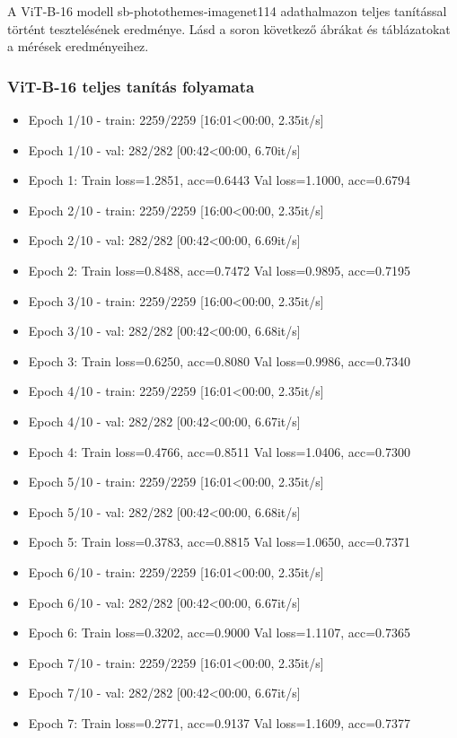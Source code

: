 A ViT-B-16 modell sb-photothemes-imagenet114 adathalmazon teljes tanítással történt tesztelésének eredménye. Lásd a soron következő ábrákat és táblázatokat a mérések eredményeihez.
\subsubsection{ViT-B-16 teljes tanítás folyamata}
\begin{itemize} 
	\item Epoch 1/10 - train: 2259/2259 [16:01<00:00,  2.35it/s]
	\item Epoch 1/10 - val: 282/282 [00:42<00:00,  6.70it/s]
	\item Epoch 1: Train loss=1.2851, acc=0.6443 Val loss=1.1000, acc=0.6794
	\item Epoch 2/10 - train: 2259/2259 [16:00<00:00,  2.35it/s]
	\item Epoch 2/10 - val: 282/282 [00:42<00:00,  6.69it/s]
	\item Epoch 2: Train loss=0.8488, acc=0.7472 Val loss=0.9895, acc=0.7195
	\item Epoch 3/10 - train: 2259/2259 [16:00<00:00,  2.35it/s]
	\item Epoch 3/10 - val: 282/282 [00:42<00:00,  6.68it/s]
	\item Epoch 3: Train loss=0.6250, acc=0.8080 Val loss=0.9986, acc=0.7340
	\item Epoch 4/10 - train: 2259/2259 [16:01<00:00,  2.35it/s]
	\item Epoch 4/10 - val: 282/282 [00:42<00:00,  6.67it/s]
	\item Epoch 4: Train loss=0.4766, acc=0.8511 Val loss=1.0406, acc=0.7300
	\item Epoch 5/10 - train: 2259/2259 [16:01<00:00,  2.35it/s]
	\item Epoch 5/10 - val: 282/282 [00:42<00:00,  6.68it/s]
	\item Epoch 5: Train loss=0.3783, acc=0.8815 Val loss=1.0650, acc=0.7371
	\item Epoch 6/10 - train: 2259/2259 [16:01<00:00,  2.35it/s]
	\item Epoch 6/10 - val: 282/282 [00:42<00:00,  6.67it/s]
	\item Epoch 6: Train loss=0.3202, acc=0.9000 Val loss=1.1107, acc=0.7365
	\item Epoch 7/10 - train: 2259/2259 [16:01<00:00,  2.35it/s]
	\item Epoch 7/10 - val: 282/282 [00:42<00:00,  6.67it/s]
	\item Epoch 7: Train loss=0.2771, acc=0.9137 Val loss=1.1609, acc=0.7377

\end{itemize}
